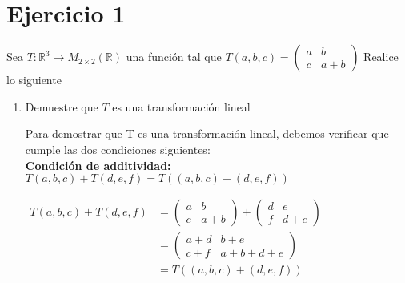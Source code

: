 \section*{Ejercicio 1}

Sea $T: \mathbb{R}^{3} \rightarrow M_{2\times2}(\mathbb{R})$ 
una función tal que $T(a,b,c) = \left(
                                    \begin{array}{cc}
                                        a & b \\
                                        c & a+b
                                    \end{array}
                                \right)$ Realice lo siguiente
\begin{enumerate}
    \item Demuestre que $T$ es una transformación lineal 
    
    Para demostrar que T es una transformación lineal,
    debemos verificar que cumple las dos condiciones 
    siguientes:\\

    \textbf{Condición de additividad:} $T(a,b,c)+T(d,e,f)=T((a,b,c)+(d,e,f))$

    $
    \begin{aligned}
        T(a,b,c) + T(d,e,f) &=  \left(
                                \begin{array}{cc}
                                    a & b \\
                                    c & a+b
                                \end{array}
                                \right) +
                                \left(
                                \begin{array}{cc}
                                    d & e \\
                                    f & d+e
                                \end{array}
                                \right) \\
                                &= \left(
                                \begin{array}{cc}
                                    a+d & b+e \\
                                    c+f & a+b+d+e
                                \end{array}
                                \right) \\
        &= T((a,b,c)+(d,e,f))
    \end{aligned}
    $\\


\end{enumerate}
